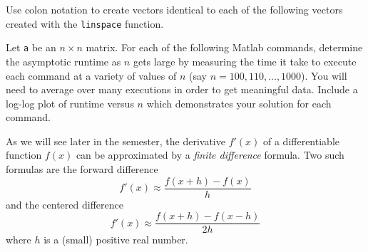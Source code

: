 \documentclass[12pt]{exam}
\begin{document}
\begin{questions}
\question Use colon notation to create vectors identical to each of the following vectors created with the \verb$linspace$ function.

\question Let \verb$a$ be an $n \times n$ matrix. For each of the following Matlab commands, determine the asymptotic runtime as $n$ gets large by measuring the time it take to execute each command at a variety of values of $n$ (say $n = 100, 110, \dots, 1000$). You will need to average over many executions in order to get meaningful data. Include a log-log plot of runtime versus $n$ which demonstrates your solution for each command.


\question As we will see later in the semester, the derivative $f'(x)$ of a differentiable function $f(x)$ can be approximated by a \emph{finite difference} formula. Two such formulas are the forward difference
\[f'(x) \approx \frac{f(x+h) - f(x)}{h}\]
and the centered difference
\[f'(x) \approx \frac{f(x+h) - f(x-h)}{2h}\]
where $h$ is a (small) positive real number.

\end{questions}
\end{document}
